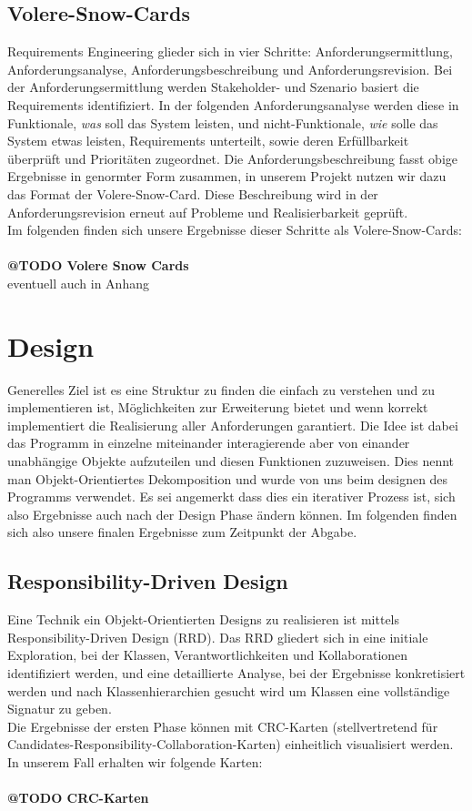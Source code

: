 \documentclass[11pt,a4paper]{article}
\begin{document}
\subsection{Volere-Snow-Cards} 
Requirements Engineering glieder sich in vier Schritte: Anforderungsermittlung, Anforderungsanalyse, Anforderungsbeschreibung und Anforderungsrevision. Bei der Anforderungsermittlung werden Stakeholder- und Szenario basiert die Requirements identifiziert. In der folgenden Anforderungsanalyse werden diese in Funktionale, \textit{was} soll das System leisten, und nicht-Funktionale, \textit{wie} solle das System etwas leisten, Requirements unterteilt, sowie deren Erfüllbarkeit überprüft und Prioritäten zugeordnet. Die Anforderungsbeschreibung fasst obige Ergebnisse in genormter Form zusammen, in unserem Projekt nutzen wir dazu das Format der Volere-Snow-Card. Diese Beschreibung wird in der Anforderungsrevision erneut auf Probleme und Realisierbarkeit geprüft.\\
Im folgenden finden sich unsere Ergebnisse dieser Schritte als Volere-Snow-Cards: 
\\
\\
\textbf{@TODO Volere Snow Cards}\\
eventuell auch in Anhang




\section{Design}
Generelles Ziel ist es eine Struktur zu finden die einfach zu verstehen und zu implementieren ist, Möglichkeiten zur Erweiterung bietet und wenn korrekt implementiert die Realisierung aller Anforderungen garantiert. Die Idee ist dabei das Programm in einzelne miteinander interagierende aber von einander unabhängige Objekte aufzuteilen und diesen Funktionen zuzuweisen. Dies nennt man Objekt-Orientiertes Dekomposition und wurde von uns beim designen des Programms verwendet. Es sei angemerkt dass dies ein iterativer Prozess ist, sich also Ergebnisse auch nach der Design Phase ändern können. Im folgenden finden sich also unsere finalen Ergebnisse zum Zeitpunkt der Abgabe.

\subsection{Responsibility-Driven Design}
Eine Technik ein Objekt-Orientierten Designs zu realisieren ist mittels Responsibility-Driven Design (RRD). Das RRD gliedert sich in eine initiale Exploration, bei der Klassen, Verantwortlichkeiten und  Kollaborationen identifiziert werden, und eine detaillierte Analyse, bei der Ergebnisse konkretisiert werden und nach Klassenhierarchien gesucht wird um Klassen eine vollständige Signatur zu geben.\\
Die Ergebnisse der ersten Phase können mit CRC-Karten (stellvertretend für Candidates-Responsibility-Collaboration-Karten) einheitlich visualisiert werden. In unserem Fall erhalten wir folgende Karten:\\
\\
\textbf{@TODO CRC-Karten}\\
\end{document}
